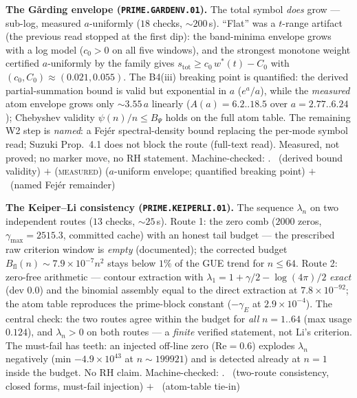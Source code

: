 \par\smallskip\noindent\textbf{The G\aa rding envelope
(\texttt{PRIME.GARDENV.01}).}
The total symbol \emph{does} grow --- sub-log, measured
$a$-uniformly ($18$ checks, ${\sim}200$\,s).  ``Flat'' was a
$t$-range artifact (the previous read stopped at the first dip): the
band-minima envelope grows with a log model ($c_0>0$ on all five
windows), and the strongest monotone weight certified $a$-uniformly
by the family gives $s_{\mathrm{tot}}\ge c_0\,w^*(t)-C_0$ with
$(c_0,C_0)\approx(0.021,0.055)$.  The B4(iii) breaking point is
quantified: the derived partial-summation bound is valid but
exponential in $a$ ($e^a/a$), while the \emph{measured} atom
envelope grows only ${\sim}3.55\,a$ linearly ($A(a)=6.2..18.5$ over
$a=2.77..6.24$); Chebyshev validity $\psi(n)/n\le B_\Psi$ holds on
the full atom table.  The remaining W2 step is \emph{named}: a
Fej\'er spectral-density bound replacing the per-mode symbol read;
Suzuki Prop.~4.1 does not block the route (full-text read).
Measured, not proved; no marker move, no RH statement.
Machine-checked: .
\mE\ (derived bound validity) $+$ (\textsc{measured}) ($a$-uniform
envelope; quantified breaking point) $+$ \mC\ (named Fej\'er
remainder)
\par\smallskip


\par\smallskip\noindent\textbf{The Keiper--Li consistency
(\texttt{PRIME.KEIPERLI.01}).}
The sequence $\lambda_n$ on two independent routes ($13$ checks,
${\sim}25$\,s).  Route 1: the zero comb ($2000$ zeros,
$\gamma_{\max}=2515.3$, committed cache) with an honest tail budget
--- the prescribed raw criterion window is \emph{empty}
(documented); the corrected budget $B_{\mathrm{fl}}(n)\sim
7.9\times10^{-7}n^2$ stays below $1\%$ of the GUE trend for
$n\le64$.  Route 2: zero-free arithmetic --- contour extraction with
$\lambda_1=1+\gamma/2-\log(4\pi)/2$ \emph{exact} (dev $0.0$) and the
binomial assembly equal to the direct extraction at
$7.8\times10^{-92}$; the atom table reproduces the prime-block
constant ($-\gamma_E$ at $2.9\times10^{-4}$).  The central check:
the two routes agree within the budget for \emph{all} $n=1..64$
(max usage $0.124$), and $\lambda_n>0$ on both routes --- a
\emph{finite} verified statement, not Li's criterion.  The must-fail
has teeth: an injected off-line zero ($\mathrm{Re}=0.6$) explodes
$\lambda_n$ negatively (min $-4.9\times10^{43}$ at
$n\sim199921$) and is detected already at $n=1$ inside the budget.
No RH claim.
Machine-checked: .
\mE\ (two-route consistency, closed forms, must-fail injection) $+$
\mC\ (atom-table tie-in)
\par\smallskip


